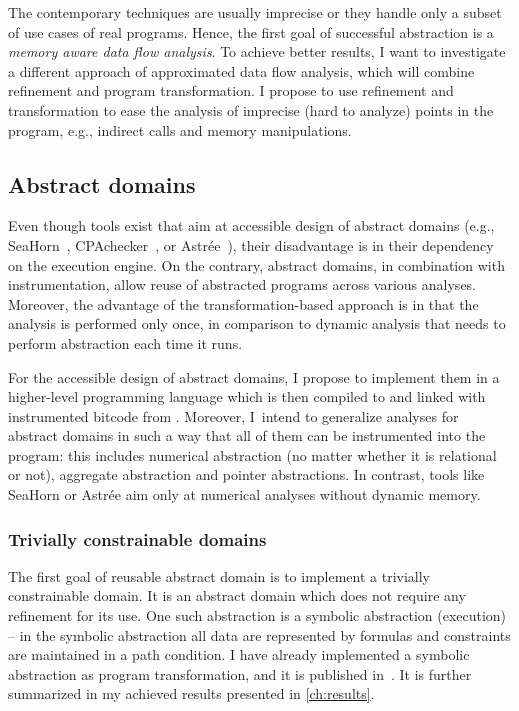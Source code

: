 The contemporary techniques are usually imprecise or they handle only a subset of use
cases of real programs. Hence, the first goal of successful abstraction is a
\emph{memory aware data flow analysis}. To achieve better results, I want to
investigate a different approach of approximated data flow analysis, which will
combine refinement and program transformation. I propose to use refinement
and transformation to ease the analysis of imprecise (hard to analyze) points
in the program, e.g., indirect calls and memory manipulations.

\subsection{Abstract domains}

Even though tools exist that aim at accessible design of abstract
domains (e.g., SeaHorn~\cite{Gurfinkel2015}, CPAchecker~\cite{Beyer2013}, or
Astrée~\cite{Astree}), their disadvantage is in their dependency on the
execution engine.  On the contrary, abstract domains, in combination with \lart
instrumentation, allow reuse of abstracted programs across various analyses.
Moreover, the advantage of the transformation-based approach is in that the
analysis is performed only once, in comparison to dynamic analysis that needs
to perform abstraction each time it runs.

For the accessible design of abstract domains, I propose to implement them in a
higher-level programming language which is then compiled to
\llvm and linked with instrumented bitcode from \lart.  Moreover, I~intend to
generalize analyses for abstract domains in such a way that all of them can be
instrumented into the program: this includes numerical abstraction (no matter
whether it is relational or not), aggregate abstraction and pointer
abstractions. In contrast, tools like SeaHorn or Astrée aim only at numerical
analyses without dynamic memory.

\subsubsection{Trivially constrainable domains}

The first goal of reusable abstract domain is to implement a trivially constrainable
domain. It is an abstract domain which does not require any refinement for its
use. One such abstraction is a symbolic abstraction (execution) -- in the symbolic
abstraction all data are represented by formulas and constraints are maintained
in a path condition. I have already implemented a symbolic abstraction as
program transformation, and it is published in~\cite{Lauko2018SymComp}.
It is further summarized in my achieved results presented in \autoref{ch:results}.

